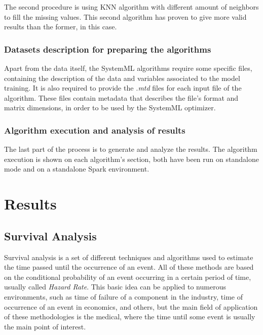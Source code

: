 \documentclass[11pt]{book} %
\begin{document}
      The second procedure is using KNN algorithm with different amount of neighbors to fill the missing values. This second algorithm has proven to give more valid results than the former, in this case.

  \subsection{Datasets description for preparing the algorithms}

    Apart from the data itself, the SystemML algorithms require some specific files, containing the description of the data and variables associated to the model training. It is also required to provide the \emph{.mtd} files for each input file of the algorithm. These files contain metadata that describes the file's format and matrix dimensions, in order to be used by the SystemML optimizer.

  \subsection{Algorithm execution and analysis of results}

    The last part of the process is to generate and analyze the results. The algorithm execution is shown on each algorithm's section, both have been run on standalone mode and on a standalone Spark environment.



\chapter{Results}
  \label{sec:results}

  \section{Survival Analysis}

    Survival analysis is a set of different techniques and algorithms used to estimate the time passed until the occurrence of an event. All of these methods are based on the conditional probability of an event occurring in a certain period of time, usually called \emph{Hazard Rate}. This basic idea can be applied to numerous environments, such as time of failure of a component in the industry, time of occurrence of an event in economics, and others, but the main field of application of these methodologies is the medical, where the time until some event is usually the main point of interest.
\end{document}
